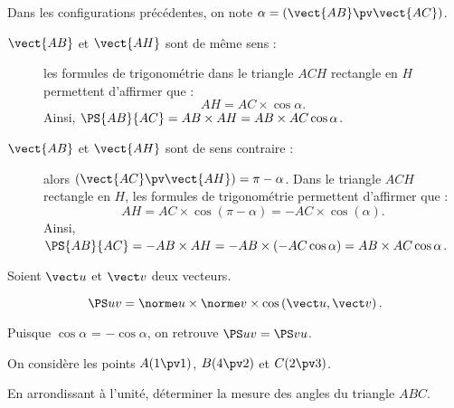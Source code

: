 \documentclass[10pt,openright,twoside,french]{book}
\begin{document}
Dans les configurations précédentes, on note $\alpha = \left(\vect{AB} \pv \vect{AC}\right)$.
    \begin{description}
        \item[\textbullet $\vect{AB}$ et $\vect{AH}$ sont de même sens :] les formules de trigonométrie dans le triangle $ACH$ rectangle en $H$ permettent d'affirmer que :
            \[AH = AC \times \cos \alpha.\]
        Ainsi, $\PS{AB}{AC} = AB \times AH = AB \times AC \cos \alpha$.
        \item[\textbullet $\vect{AB}$ et $\vect{AH}$ sont de sens contraire :] alors $\left(\vect{AC} \pv \vect{AH}\right) = \pi - \alpha$. Dans le triangle $ACH$ rectangle en $H$, les formules de trigonométrie permettent d'affirmer que :
            \[AH = AC \times \cos(\pi - \alpha) = -AC \times\cos(\alpha).\]
        Ainsi, $\PS{AB}{AC} = -AB \times AH = -AB \times (-AC \cos \alpha) = AB \times AC \cos \alpha$.
    \end{description}
    
\begin{Prop}
    Soient $\vect u$ et $\vect v$ deux vecteurs.\par
    \[\PS u v = \norme u \times\norme v \times \cos\left(\vect u , \vect v\right).\]
\end{Prop}

\begin{Rmq}
    Puisque $\cos \alpha$ = $-\cos\alpha$, on retrouve $\PS u v = \PS v u$.
\end{Rmq}

\begin{Exemple}
    On considère les points $A(1 \pv 1)$, $B(4 \pv 2)$ et $C(2 \pv 3)$.\par
    En arrondissant à l'unité, déterminer la mesure des angles du triangle $ABC$.
\end{Exemple}
    
\end{document}
